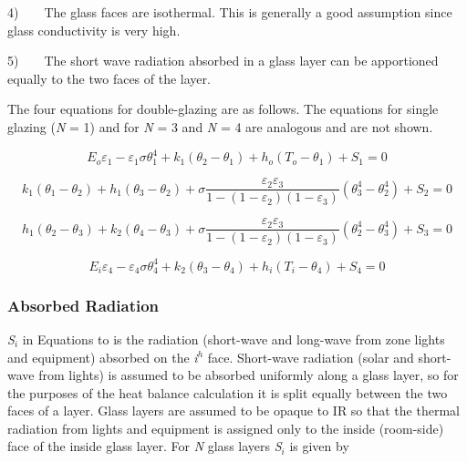 4)~~~~The glass faces are isothermal. This is generally a good assumption since glass conductivity is very high.

5)~~~~The short wave radiation absorbed in a glass layer can be apportioned equally to the two faces of the layer.

The four equations for double-glazing are as follows. The equations for single glazing (\emph{N} = 1) and for \emph{N} = 3 and \emph{N} = 4 are analogous and are not shown.

\begin{equation}
{E_o}{\varepsilon_1} - {\varepsilon_1}\sigma \theta_1^4 + {k_1}\left( {{\theta_2} - {\theta_1}} \right) + {h_o}\left( {{T_o} - {\theta_1}} \right) + {S_1} = 0
\end{equation}

\begin{equation}
{k_1}\left( {{\theta_1} - {\theta_2}} \right) + {h_1}\left( {{\theta_3} - {\theta_2}} \right) + \sigma \frac{{{\varepsilon_2}{\varepsilon_3}}}{{1 - \left( {1 - {\varepsilon_2}} \right)\left( {1 - {\varepsilon_3}} \right)}}\left( {\theta_3^4 - \theta_2^4} \right) + {S_2} = 0
\end{equation}

\begin{equation}
{h_1}({\theta_2} - {\theta_3}) + {k_2}({\theta_4} - {\theta_3}) + \sigma \frac{{{\varepsilon_2}{\varepsilon_3}}}{{1 - \left( {1 - {\varepsilon_2}} \right)\left( {1 - {\varepsilon_3}} \right)}}\left( {\theta_2^4 - \theta_3^4} \right) + {S_3} = 0
\end{equation}

\begin{equation}
{E_i}{\varepsilon_4} - {\varepsilon_4}\sigma \theta_4^4 + {k_2}\left( {{\theta_3} - {\theta_4}} \right) + {h_i}\left( {{T_i} - {\theta_4}} \right) + {S_4} = 0
\end{equation}

\subsubsection{Absorbed Radiation}\label{absorbed-radiation}

\emph{S\(_{i}\)} in Equations to is the radiation (short-wave and long-wave from zone lights and equipment) absorbed on the \emph{i}\(^{h}\) face. Short-wave radiation (solar and short-wave from lights) is assumed to be absorbed uniformly along a glass layer, so for the purposes of the heat balance calculation it is split equally between the two faces of a layer. Glass layers are assumed to be opaque to IR so that the thermal radiation from lights and equipment is assigned only to the inside (room-side) face of the inside glass layer. For \emph{N} glass layers \emph{S\(_{i}\)} is given by

